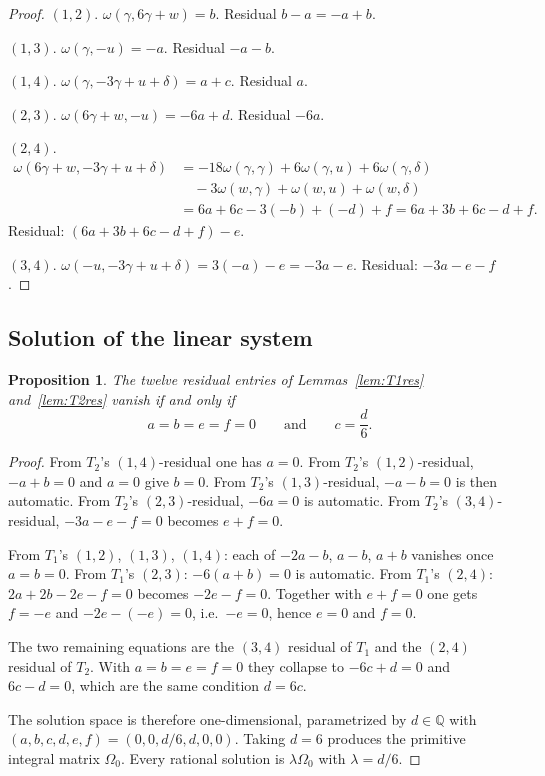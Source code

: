 \documentclass[11pt,a4paper]{article}
\newtheorem{proposition}[theorem]{Proposition}
\theoremstyle{definition}
\theoremstyle{remark}
\newcommand{\Q}{\mathbb{Q}}
\begin{document}
\begin{proof}
$(1,2)$. $\omega(\gamma,6\gamma+w)=b$. Residual $b-a=-a+b$.

$(1,3)$. $\omega(\gamma,-u)=-a$. Residual $-a-b$.

$(1,4)$. $\omega(\gamma,-3\gamma+u+\delta)=a+c$. Residual $a$.

$(2,3)$. $\omega(6\gamma+w,-u)=-6a+d$. Residual $-6a$.

$(2,4)$.
\begin{align*}
\omega(6\gamma+w,-3\gamma+u+\delta)
&=-18\omega(\gamma,\gamma)+6\omega(\gamma,u)+6\omega(\gamma,\delta)\\
&\quad-3\omega(w,\gamma)+\omega(w,u)+\omega(w,\delta)\\
&=6a+6c-3(-b)+(-d)+f=6a+3b+6c-d+f.
\end{align*}
Residual: $(6a+3b+6c-d+f)-e$.

$(3,4)$. $\omega(-u,-3\gamma+u+\delta)=3(-a)-e=-3a-e$. Residual: $-3a-e-f$.
\end{proof}

\subsection{Solution of the linear system}

\begin{proposition}\label{prop:kernel}
The twelve residual entries of Lemmas~\ref{lem:T1res} and~\ref{lem:T2res} vanish if and only if
\[
a=b=e=f=0\qquad\text{and}\qquad c=\frac{d}{6}.
\]
\end{proposition}

\begin{proof}
From $T_2$'s $(1,4)$-residual one has $a=0$. From $T_2$'s $(1,2)$-residual, $-a+b=0$ and $a=0$ give $b=0$. From $T_2$'s $(1,3)$-residual, $-a-b=0$ is then automatic. From $T_2$'s $(2,3)$-residual, $-6a=0$ is automatic. From $T_2$'s $(3,4)$-residual, $-3a-e-f=0$ becomes $e+f=0$.

From $T_1$'s $(1,2)$, $(1,3)$, $(1,4)$: each of $-2a-b$, $a-b$, $a+b$ vanishes once $a=b=0$. From $T_1$'s $(2,3)$: $-6(a+b)=0$ is automatic. From $T_1$'s $(2,4)$: $2a+2b-2e-f=0$ becomes $-2e-f=0$. Together with $e+f=0$ one gets $f=-e$ and $-2e-(-e)=0$, i.e.\ $-e=0$, hence $e=0$ and $f=0$.

The two remaining equations are the $(3,4)$ residual of $T_1$ and the $(2,4)$ residual of $T_2$. With $a=b=e=f=0$ they collapse to $-6c+d=0$ and $6c-d=0$, which are the same condition $d=6c$.

The solution space is therefore one-dimensional, parametrized by $d\in\Q$ with $(a,b,c,d,e,f)=(0,0,d/6,d,0,0)$. Taking $d=6$ produces the primitive integral matrix $\Omega_0$. Every rational solution is $\lambda\Omega_0$ with $\lambda=d/6$.
\end{proof}
\end{document}
